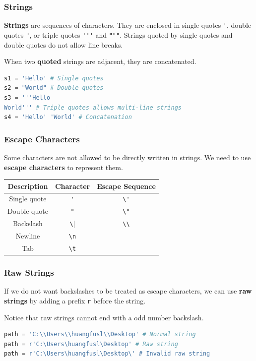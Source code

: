 \documentclass[beamer, en, version=2.0]{huangfusl-template}
\begin{document}
    \begin{frame}[fragile]
        \frametitle{Strings}

        \textbf{Strings} are sequences of characters. They are enclosed in single quotes {\footnotesize\verb|'|}, double quotes {\footnotesize\verb|"|}, or triple quotes {\footnotesize\verb|'''|} and {\footnotesize\verb|"""|}. Strings quoted by single quotes and double quotes do not allow line breaks.

        When two \textbf{quoted} strings are adjacent, they are concatenated.

\begin{lstlisting}[language=python]
s1 = 'Hello' # Single quotes
s2 = "World" # Double quotes
s3 = '''Hello
World''' # Triple quotes allows multi-line strings
s4 = 'Hello' 'World' # Concatenation
\end{lstlisting}
    \end{frame}
    \begin{frame}[fragile]
        \frametitle{Escape Characters}

        Some characters are not allowed to be directly written in strings. We need to use \textbf{escape characters} to represent them.

        \begin{table}[h]
            \begin{tabular}{ccc}
                \toprule
                Description & Character & Escape Sequence \\
                \midrule
                Single quote & {\footnotesize\verb|'|} & {\footnotesize\verb|\'|} \\
                Double quote & {\footnotesize\verb|"|} & {\footnotesize\verb|\"|} \\
                Backslash & {\footnotesize\verb|\|} & {\footnotesize\verb|\\|} \\
                Newline & {\footnotesize\verb|\n|} & \\
                Tab & {\footnotesize\verb|\t|} & \\
                \bottomrule
            \end{tabular}
        \end{table}
    \end{frame}
    \begin{frame}[fragile]
        \frametitle{Raw Strings}

        If we do not want backslashes to be treated as escape characters, we can use \textbf{raw strings} by adding a prefix {\footnotesize\verb|r|} before the string.

        Notice that raw strings cannot end with a odd number backslash.

\begin{lstlisting}[language=python]
path = 'C:\\Users\\huangfusl\\Desktop' # Normal string
path = r'C:\Users\huangfusl\Desktop' # Raw string
path = r'C:\Users\huangfusl\Desktop\' # Invalid raw string
\end{lstlisting}
    \end{frame}
\end{document}
